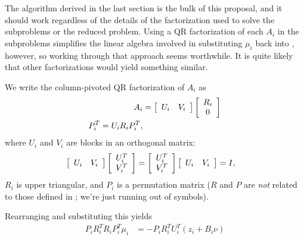 The algorithm derived in the last section is the bulk of this proposal, and it should work regardless of the details of the factorization used to solve the subproblems or the reduced problem.
Using a QR factorization of each $A_i$ in the subproblems  simplifies the linear algebra involved in substituting $\mu_i$ back into , however, so working through that approach seems worthwhile.
It is quite likely that other factorizations would yield something similar.

We write the column-pivoted QR factorization of $A_i$ as
\begin{align}
    A_i &= \left[
        \begin{array}{ c c }
            U_i & V_i
        \end{array}
    \right]
    \left[
        \begin{array}{ c }
            R_i \\
            0
        \end{array}
    \right] \\
    P_i^T
    = U_i R_i P_i^T ,
    \label{eq:vp_star_qr}
\end{align}
where $U_i$ and $V_i$ are blocks in an orthogonal matrix:
\begin{align}
    \left[
        \begin{array}{ c c }
            U_i & V_i
        \end{array}
    \right]
    \left[
        \begin{array}{ c }
            U_i^T \\
            V_i^T
        \end{array}
    \right]
    &=
    \left[
        \begin{array}{ c }
            U_i^T \\
            V_i^T
        \end{array}
    \right]
    \left[
        \begin{array}{ c c }
            U_i & V_i
        \end{array}
    \right]
    = I,
\end{align}
$R_i$ is upper triangular, and $P_i$ is a permutation matrix ($R$ and $P$ are \emph{not} related to those defined in ; we're just running out of symbols).

Rearranging  and substituting this yields
\begin{align}
    P_i R_i^T R_i P_i^T \mu_i &= -P_i R_i^T U_i^T \left(z_i + B_i\nu\right) \label{eq:vp_star_subproblem_qr_1}
\end{align}

